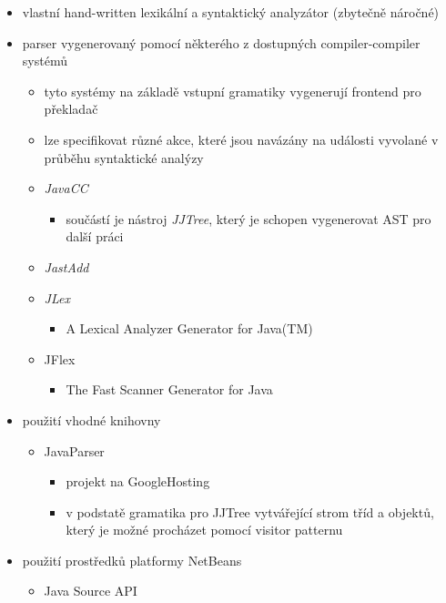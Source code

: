 \begin{itemize}
\item vlastní hand-written lexikální a syntaktický analyzátor (zbytečně náročné)
\item parser vygenerovaný pomocí některého z dostupných compiler-compiler systémů
  \begin{itemize}
  \item tyto systémy na základě vstupní gramatiky vygenerují frontend pro překladač
  \item lze specifikovat různé akce, které jsou navázány na události vyvolané v průběhu syntaktické analýzy
  \item \emph{JavaCC} \cite{parsertools:javacc}
    \begin{itemize}
    \item součástí je nástroj \emph{JJTree}, který je schopen vygenerovat AST pro další práci
    \end{itemize}
  \item \emph{JastAdd} \cite {parsertools:jastadd}
  \item \emph{JLex} \cite{parsertools:jlex}
    \begin{itemize}
    \item A Lexical Analyzer Generator for Java(TM)
    \end{itemize}
  \item JFlex \cite{parsertools:jflex}
    \begin{itemize}
    \item The Fast Scanner Generator for Java
    \end{itemize}
  \end{itemize}
\item použití vhodné knihovny
  \begin{itemize}
  \item JavaParser \cite{parsertools:javaparser}
    \begin{itemize}
    \item projekt na GoogleHosting
    \item v podstatě gramatika pro JJTree vytvářející strom tříd a objektů, který je možné procházet pomocí visitor patternu
    \end{itemize}
  \end{itemize}
\item použití prostředků platformy NetBeans \cite{parsertools:javasourcejavadoc}
  \begin{itemize}
  \item Java Source API
  \end{itemize}

\end{itemize}
